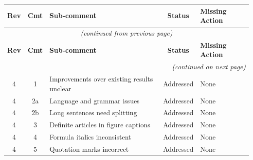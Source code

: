 \documentclass[journal,twoside,web]{ieeecolor}
\begin{document}
\begin{longtable}{|c|c|p{5.5cm}|c|p{3.5cm}|}
\hline
\textbf{Rev} & \textbf{Cmt} & \textbf{Sub-comment} & \textbf{Status} & \textbf{Missing Action} \\
\hline
\endfirsthead
\multicolumn{5}{c}{\textit{(continued from previous page)}} \\
\hline
\textbf{Rev} & \textbf{Cmt} & \textbf{Sub-comment} & \textbf{Status} & \textbf{Missing Action} \\
\hline
\endhead
\hline
\multicolumn{5}{r}{\textit{(continued on next page)}} \\
\endfoot
\hline
\endlastfoot

4 & 1 & Improvements over existing results unclear & Addressed & None \\
\hline
4 & 2a & Language and grammar issues & Addressed & None \\
\hline
4 & 2b & Long sentences need splitting & Addressed & None \\
\hline
4 & 3 & Definite articles in figure captions & Addressed & None \\
\hline
4 & 4 & Formula italics inconsistent & Addressed & None \\
\hline
4 & 5 & Quotation marks incorrect & Addressed & None \\
\hline


\end{longtable}
\end{document}
